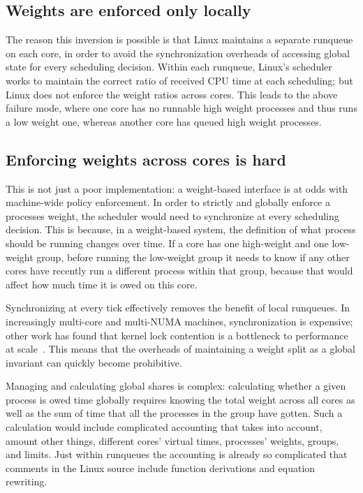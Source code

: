 \subsection{Weights are enforced only locally}\label{ss:problem:weights-local}

The reason this inversion is possible is that Linux maintains a separate
runqueue on each core, in order to avoid the synchronization overheads of
accessing global state for every scheduling decision. Within each runqueue,
Linux's scheduler works to maintain the correct ratio of received CPU time at
each scheduling; but Linux does not enforce the weight ratios across cores. This
leads to the above failure mode, where one core has no runnable high weight
processes and thus runs a low weight one, whereas another core has queued high
weight processes.

\subsection{Enforcing weights across cores is
hard}\label{ss:problem:cross-core-hard}

This is not just a poor implementation: a weight-based interface is at odds with
machine-wide policy enforcement. In order to strictly and globally enforce a
processes weight, the scheduler would need to synchronize at every scheduling
decision. This is because, in a weight-based system, the definition of what
process should be running changes over time. If a core has one high-weight and
one low-weight group, before running the low-weight group it needs to know if
any other cores have recently run a different process within that group, because
that would affect how much time it is owed on this core.

Synchronizing at every tick effectively removes the benefit of local runqueues.
In increasingly multi-core and multi-NUMA machines, synchronization is
expensive; other work has found that kernel lock contention is a bottleneck to
performance at scale~\cite{afaas}. This means that the overheads of maintaining
a weight split as a global invariant can quickly become prohibitive.

Managing and calculating global shares is complex: calculating whether a given
process is owed time globally requires knowing the total weight across all cores
as well as the sum of time that all the processes in the group have gotten. Such
a calculation would include complicated accounting that takes into account,
amount other things, different cores' virtual times, processes' weights, groups,
and limits. Just within runqueues the accounting is already so complicated that
comments in the Linux source include function derivations and equation
rewriting.


